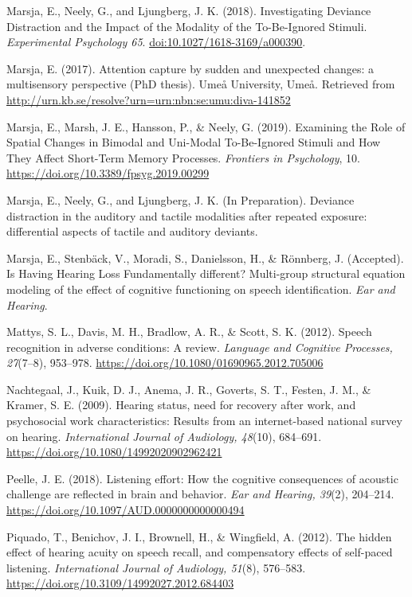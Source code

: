 \documentclass[]{article}
\begin{document}
Marsja, E., Neely, G., and Ljungberg, J. K. (2018). Investigating
Deviance Distraction and the Impact of the Modality of the To-Be-Ignored
Stimuli. \emph{Experimental Psychology 65}.
\url{doi:10.1027/1618-3169/a000390}.

Marsja, E. (2017). Attention capture by sudden and unexpected changes: a
multisensory perspective (PhD thesis). Umeå University, Umeå. Retrieved
from \url{http://urn.kb.se/resolve?urn=urn:nbn:se:umu:diva-141852}

Marsja, E., Marsh, J. E., Hansson, P., \& Neely, G. (2019). Examining
the Role of Spatial Changes in Bimodal and Uni-Modal To-Be-Ignored
Stimuli and How They Affect Short-Term Memory Processes. \emph{Frontiers
in Psychology}, 10. \url{https://doi.org/10.3389/fpsyg.2019.00299}

Marsja, E., Neely, G., and Ljungberg, J. K. (In Preparation). Deviance
distraction in the auditory and tactile modalities after repeated
exposure: differential aspects of tactile and auditory deviants.

Marsja, E., Stenbäck, V., Moradi, S., Danielsson, H., \& Rönnberg, J.
(Accepted). Is Having Hearing Loss Fundamentally different? Multi-group
structural equation modeling of the effect of cognitive functioning on
speech identification. \emph{Ear and Hearing}.

Mattys, S. L., Davis, M. H., Bradlow, A. R., \& Scott, S. K. (2012).
Speech recognition in adverse conditions: A review. \emph{Language and
Cognitive Processes, 27}(7--8), 953--978.
\url{https://doi.org/10.1080/01690965.2012.705006}

Nachtegaal, J., Kuik, D. J., Anema, J. R., Goverts, S. T., Festen, J.
M., \& Kramer, S. E. (2009). Hearing status, need for recovery after
work, and psychosocial work characteristics: Results from an
internet-based national survey on hearing. \emph{International Journal
of Audiology, 48}(10), 684--691.
\url{https://doi.org/10.1080/14992020902962421}

Peelle, J. E. (2018). Listening effort: How the cognitive consequences
of acoustic challenge are reflected in brain and behavior. \emph{Ear and
Hearing, 39}(2), 204--214.
\url{https://doi.org/10.1097/AUD.0000000000000494}

Piquado, T., Benichov, J. I., Brownell, H., \& Wingfield, A. (2012). The
hidden effect of hearing acuity on speech recall, and compensatory
effects of self-paced listening. \emph{International Journal of
Audiology, 51}(8), 576--583.
\url{https://doi.org/10.3109/14992027.2012.684403}
\end{document}
